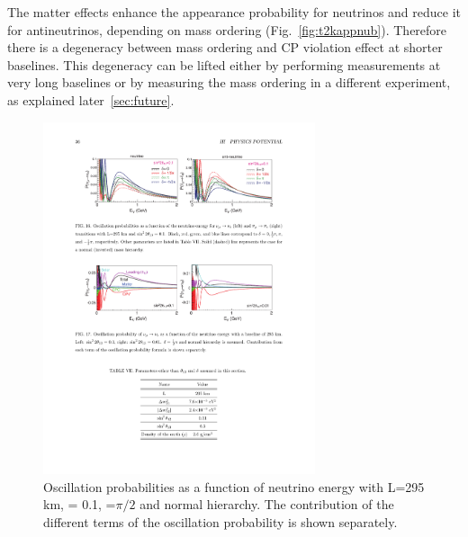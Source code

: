 The matter effects enhance the appearance probability for neutrinos and reduce it for antineutrinos, depending on mass ordering (Fig.~\ref{fig:t2kappnub}). Therefore there is a degeneracy between mass ordering and CP violation effect at shorter baselines. This degeneracy can be lifted either by performing measurements at very long baselines or by measuring the mass ordering in a different experiment, as explained later~\ref{sec:future}.

\begin{figure} [htbp!]
\begin{center}
\includegraphics[width=8cm]{figures/papp_prob_2.pdf}
\caption{\label{fig:t2kappprob} Oscillation probabilities as a function of neutrino energy with L=295 km, \stot = 0.1, \dcp=$\pi/2$ and normal hierarchy. The contribution of the different terms of the oscillation probability is shown separately.}
\end{center}
\end{figure}


